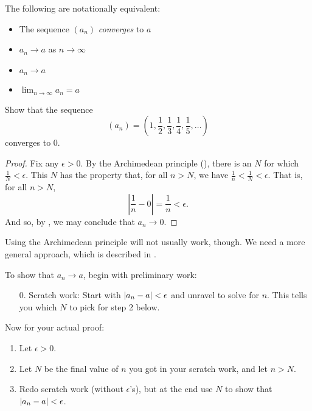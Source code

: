 \begin{remark}
  The following are notationally equivalent:
  \begin{itemize}
    \item The sequence $(a_n)$ \textit{converges} to $a$
    \item $a_n \to a$ as $n \to \infty$
    \item $a_n \to a$
    \item $\lim_{n \to \infty} a_n = a$
  \end{itemize}
\end{remark}

\begin{example}
  Show that the sequence
  \[ (a_n) = \left(1, \frac{1}{2}, \frac{1}{3}, \frac{1}{4},
  \frac{1}{5}, \dots\right) \]
  converges to 0.

  \begin{proof}
    Fix any $\epsilon > 0$. By the Archimedean principle
    (), there is an $N$ for which
    $\frac{1}{N} < \epsilon$. This $N$ has the property
    that, for all $n > N$, we have $\frac{1}{n} < \frac{1}{N} <
    \epsilon$. That is, for all $n > N$,
    \[ \left|\frac{1}{n} - 0\right| = \frac{1}{n} < \epsilon. \]
    And so, by , we may conclude that
    $a_n \to 0$.
  \end{proof}
\end{example}

\begin{remark}
  Using the Archimedean principle will not usually work, though. We
  need a more general approach, which is described in
  .
\end{remark}

\begin{outline}
  To show that $a_n \to a$, begin with preliminary work:
  \begin{enumerate}
    \item[0.] Scratch work: Start with $| a_n - a | < \epsilon$ and
      unravel to solve for $n$. This tells you which $N$ to pick for
      step 2 below.
  \end{enumerate}
  Now for your actual proof:
  \begin{enumerate}
    \item Let $\epsilon > 0$.
    \item Let $N$ be the final value of $n$ you got in your scratch
      work, and let $n > N$.
    \item Redo scratch work (without $\epsilon$'s), but at the end
      use $N$ to show that $| a_n - a | < \epsilon$.
  \end{enumerate}
\end{outline}

